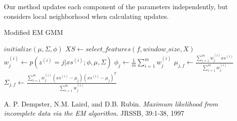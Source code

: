\documentclass[10pt,a4paper]{article}
\begin{document}
Our method updates each component of the parameters independently, but considers local neighborhood when calculating updates.
\begin{algorithm}
\caption{Modified EM GMM}
\begin{algorithmic}
\State $initialize(\mu, \Sigma, \phi)$
        \State $XS\gets select\_features(f, window\_size, X)$
        \State $w_j^{(i)}\gets p(z^{(i)} = j|xs^{(i)}; \phi, \mu, \Sigma)$
        \State
        \State $\phi_{j}\gets\frac{1}{m}\sum_{i=1}^{m}w_j^{(i)}$
        \State $\mu_{j,f}\gets\frac{\sum_{i=1}^mw_j^{(i)}xs^{(i)}}{\sum_{i=1}^mw_j^{(i)}}$
        \State $\Sigma_{j,f}\gets\frac{\sum_{i=1}^mw_j^{(i)}(xs^{(i)}-\mu_j)(xs^{(i)}-\mu_j)^T}{\sum_{i=1}^mw_j^{(i)}}$
    \EndFor
\EndFor
\EndFunction
\end{algorithmic}
\end{algorithm}

\begin{thebibliography}{9}

  A. P. Dempster, N.M. Laird, and D.B. Rubin.
  \emph{Maximum likelihood from incomplete data via the EM algorithm}.
  JRSSB, 39:1-38,
  1997
\end{thebibliography}
\end{document}
